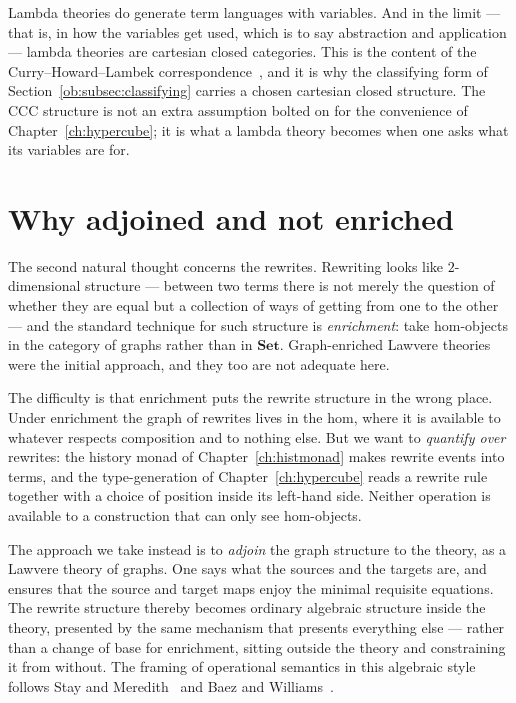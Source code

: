 Lambda theories do generate term languages with variables. And in the limit --- that is,
in how the variables get used, which is to say abstraction and application --- lambda
theories are cartesian closed categories. This is the content of the
Curry--Howard--Lambek correspondence~\cite{LambekScott1986}, and it is why the
classifying form of Section~\ref{ob:subsec:classifying} carries a chosen cartesian closed
structure. The CCC structure is not an extra assumption bolted on for the convenience of
Chapter~\ref{ch:hypercube}; it is what a lambda theory becomes when one asks what its
variables are for.

\section{Why adjoined and not enriched}

The second natural thought concerns the rewrites. Rewriting looks like $2$-dimensional
structure --- between two terms there is not merely the question of whether they are
equal but a collection of ways of getting from one to the other --- and the standard
technique for such structure is \emph{enrichment}: take hom-objects in the category of
graphs rather than in $\mathbf{Set}$. Graph-enriched Lawvere theories were the initial
approach, and they too are not adequate here.

The difficulty is that enrichment puts the rewrite structure in the wrong place. Under
enrichment the graph of rewrites lives in the hom, where it is available to whatever
respects composition and to nothing else. But we want to \emph{quantify over} rewrites:
the history monad of Chapter~\ref{ch:histmonad} makes rewrite events into terms, and the
type-generation of Chapter~\ref{ch:hypercube} reads a rewrite rule together with a
choice of position inside its left-hand side. Neither operation is available to a
construction that can only see hom-objects.

The approach we take instead is to \emph{adjoin} the graph structure to the theory,
as a Lawvere theory of graphs. One says what the sources and the targets are, and ensures
that the source and target maps enjoy the minimal requisite equations. The rewrite
structure thereby becomes ordinary algebraic structure inside the theory, presented by
the same mechanism that presents everything else --- rather than a change of base for
enrichment, sitting outside the theory and constraining it from without. The framing of
operational semantics in this algebraic style follows Stay and
Meredith~\cite{OSLF} and Baez and Williams~\cite{BaezWilliams2020}.

